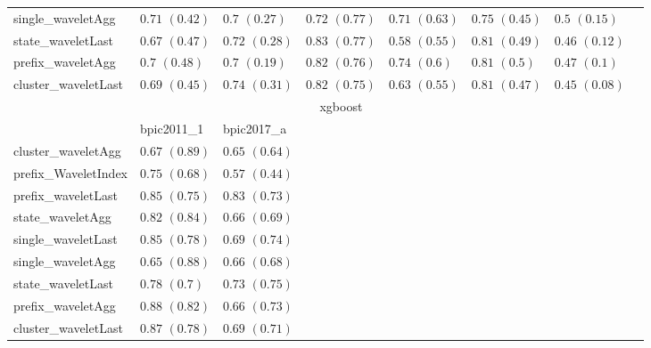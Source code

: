 \documentclass[twoside,11pt]{Latex/Classes/PhDthesisPSnPDF}
\begin{document}
\begin{table}[h]
{\begin{tabular}{llllllll}
				single\_waveletAgg & $0.71$ ${(0.42)}$ & $0.7$ ${(0.27)}$ & $0.72$ ${(0.77)}$ & $0.71$ ${(0.63)}$ & $0.75$ ${(0.45)}$ & $0.5$ ${(0.15)}$ \\
				state\_waveletLast & $0.67$ ${(0.47)}$ & $0.72$ ${(0.28)}$ & $0.83$ ${(0.77)}$ & $0.58$ ${(0.55)}$ & $0.81$ ${(0.49)}$ & $0.46$ ${(0.12)}$ \\
				prefix\_waveletAgg & $0.7$ ${(0.48)}$ & $0.7$ ${(0.19)}$ & $0.82$ ${(0.76)}$ & $\mathbf{0.74}$ $\mathbf{(0.6)}$  & $0.81$ ${(0.5)}$ & $0.47$ ${(0.1)}$ \\
				cluster\_waveletLast & $0.69$ ${(0.45)}$ & $0.74$ ${(0.31)}$ & $0.82$ ${(0.75)}$ & $0.63$ ${(0.55)}$ & $0.81$ ${(0.47)}$ & $0.45$ ${(0.08)}$ \\
				\bottomrule
				\toprule
				& \multicolumn{5}{c}{xgboost}
				\\
				& bpic2011\_1 & bpic2017\_a
				\\ \midrule
				cluster\_waveletAgg & $0.67$ ${(0.89)}$ & $0.65$ ${(0.64)}$ \\
				prefix\_WaveletIndex & $0.75$ ${(0.68)}$ & $0.57$ ${(0.44)}$ \\
				prefix\_waveletLast & $0.85$ ${(0.75)}$ & $0.83$ ${(0.73)}$ \\
				state\_waveletAgg & $0.82$ ${(0.84)}$ & $0.66$ ${(0.69)}$ \\
				single\_waveletLast & $0.85$ ${(0.78)}$ & $0.69$ ${(0.74)}$ \\
				single\_waveletAgg & $0.65$ ${(0.88)}$ & $0.66$ ${(0.68)}$ \\
				state\_waveletLast & $0.78$ ${(0.7)}$ & $0.73$ ${(0.75)}$ \\
				prefix\_waveletAgg & $0.88$ ${(0.82)}$ & $0.66$ ${(0.73)}$ \\
				cluster\_waveletLast & $0.87$ ${(0.78)}$ & $0.69$ ${(0.71)}$ \\
				\bottomrule
	

		\end{tabular}%
	}
\end{table}
\end{document}
